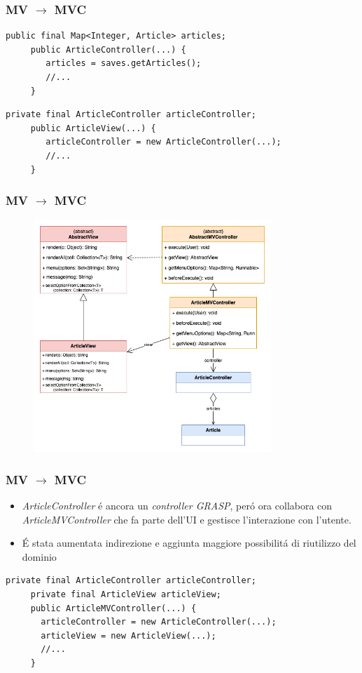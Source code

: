 \begin{frame} [fragile]
    \frametitle{MV $\to$ MVC}
    \begin{lstlisting}[autogobble, title={\texttt{ArticleController.java}}]
     public final Map<Integer, Article> articles;
     public ArticleController(...) {
        articles = saves.getArticles();
        //...
     }
    \end{lstlisting}
    \begin{lstlisting}[autogobble, title={\texttt{ArticleView.java}}]
     private final ArticleController articleController;
     public ArticleView(...) {
        articleController = new ArticleController(...);
        //...
     }

    \end{lstlisting}
\end{frame}

\begin{frame}
    \frametitle{MV $\to$ MVC}
    \begin{figure}
        \includegraphics[width=0.8\textwidth]{img/modello-vista_after.png}
    \end{figure}
\end{frame}

\begin{frame} [fragile]
    \frametitle{MV $\to$ MVC}
    \begin{itemize}
        \item \emph{ArticleController} é ancora un \emph{controller GRASP}, peró ora collabora con \emph{ArticleMVController}
        che fa parte dell'UI e gestisce l'interazione con l'utente.
        \item É stata aumentata indirezione e aggiunta maggiore possibilitá di riutilizzo del dominio
    \end{itemize}
    \begin{lstlisting}[autogobble, title={\texttt{ArticleMVController.java}}]
     private final ArticleController articleController;
     private final ArticleView articleView;
     public ArticleMVController(...) {
       articleController = new ArticleController(...);
       articleView = new ArticleView(...);
       //...
     }
    \end{lstlisting}
\end{frame}